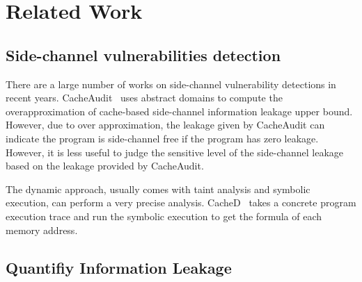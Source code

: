\section{Related Work}
\subsection{Side-channel vulnerabilities detection}

There are a large number of works on side-channel vulnerability detections in recent years.
CacheAudit~\cite{182946} uses abstract domains to compute the overapproximation of cache-based
side-channel information leakage upper bound. However, due to over approximation, the leakage
given by CacheAudit can indicate the program is side-channel free if the program has zero leakage. 
However, it is less useful to judge the sensitive level of the side-channel leakage based on the
leakage provided by CacheAudit. 

The dynamic approach, usually comes with taint analysis and symbolic execution, can perform a very 
precise analysis. CacheD~\cite{203878} takes a concrete program execution trace and run the symbolic
execution to get the formula of each memory address. 
\subsection{Quantifiy Information Leakage}